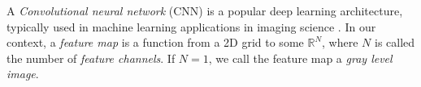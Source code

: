 \documentclass[10pt,a4paper]{article}
\begin{document}
A \emph{Convolutional neural network} (CNN) is a popular deep learning architecture, typically used in machine learning applications in imaging science \cite{CNN_Nature,CNNLeCun}.
%
In our context,  a  \emph{feature map} is a function from a 2D grid to some $\mathbb{R}^N$, 
where $N$ is called the number of \emph{feature channels}. If $N=1$, we call the feature map a \emph{gray level image}.
\end{document}
